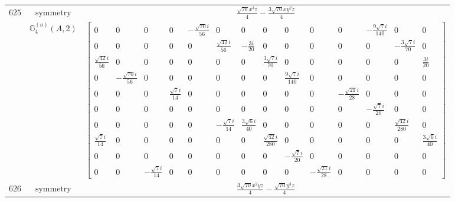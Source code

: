 \documentclass[fleqn,8pt,landscape]{jsarticle}
\begin{document}
\begin{longtable}{ccc}
$ 625 $ & $ \text{symmetry} $ & $ \frac{\sqrt{70} x^{3} z}{4} - \frac{3 \sqrt{70} x y^{2} z}{4} $ \\
$  $ & $ \mathbb{G}_{4}^{(a)}(A,2) $ & $ \begin{bmatrix} 0 & 0 & 0 & 0 & - \frac{\sqrt{70} i}{56} & 0 & 0 & 0 & 0 & 0 & 0 & - \frac{9 \sqrt{7} i}{140} & 0 & 0 \\ 0 & 0 & 0 & 0 & 0 & \frac{\sqrt{42} i}{56} & - \frac{3 i}{20} & 0 & 0 & 0 & 0 & 0 & - \frac{3 \sqrt{7} i}{70} & 0 \\ \frac{\sqrt{42} i}{56} & 0 & 0 & 0 & 0 & 0 & 0 & \frac{3 \sqrt{7} i}{70} & 0 & 0 & 0 & 0 & 0 & \frac{3 i}{20} \\ 0 & - \frac{\sqrt{70} i}{56} & 0 & 0 & 0 & 0 & 0 & 0 & \frac{9 \sqrt{7} i}{140} & 0 & 0 & 0 & 0 & 0 \\ 0 & 0 & 0 & \frac{\sqrt{7} i}{14} & 0 & 0 & 0 & 0 & 0 & 0 & - \frac{\sqrt{21} i}{28} & 0 & 0 & 0 \\ 0 & 0 & 0 & 0 & 0 & 0 & 0 & 0 & 0 & 0 & 0 & - \frac{\sqrt{7} i}{20} & 0 & 0 \\ 0 & 0 & 0 & 0 & 0 & - \frac{\sqrt{7} i}{14} & \frac{3 \sqrt{6} i}{40} & 0 & 0 & 0 & 0 & 0 & \frac{\sqrt{42} i}{280} & 0 \\ \frac{\sqrt{7} i}{14} & 0 & 0 & 0 & 0 & 0 & 0 & \frac{\sqrt{42} i}{280} & 0 & 0 & 0 & 0 & 0 & \frac{3 \sqrt{6} i}{40} \\ 0 & 0 & 0 & 0 & 0 & 0 & 0 & 0 & - \frac{\sqrt{7} i}{20} & 0 & 0 & 0 & 0 & 0 \\ 0 & 0 & - \frac{\sqrt{7} i}{14} & 0 & 0 & 0 & 0 & 0 & 0 & - \frac{\sqrt{21} i}{28} & 0 & 0 & 0 & 0 \end{bmatrix} $ \\ \hline
$ 626 $ & $ \text{symmetry} $ & $ \frac{3 \sqrt{70} x^{2} y z}{4} - \frac{\sqrt{70} y^{3} z}{4} $ \\

\end{longtable}
\end{document}
